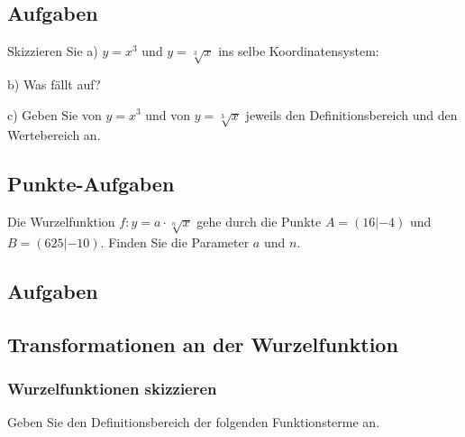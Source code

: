 \newpage
\subsection*{Aufgaben}
Skizzieren Sie
a) $y=x^3$ und $y=\sqrt[3]{x}$ ins selbe Koordinatensystem:


b) Was fällt auf?


c) Geben Sie von $y=x^3$ und von $y=\sqrt[3]{x}$ jeweils den
Definitionsbereich und den Wertebereich an.


\newpage


\subsection{Punkte-Aufgaben}
Die Wurzelfunktion $f: y= a\cdot{} \sqrt[n]{x}$ gehe durch die Punkte
$A= (16 | -4)$ und $B=(625 | -10)$. Finden Sie die Parameter $a$ und
$n$.

\TRAINER{\vspace{80mm}}

\subsection*{Aufgaben}
\newpage


\subsection{Transformationen an der Wurzelfunktion}

\subsubsection{Wurzelfunktionen skizzieren}


Geben Sie den Definitionsbereich der folgenden Funktionsterme an.


